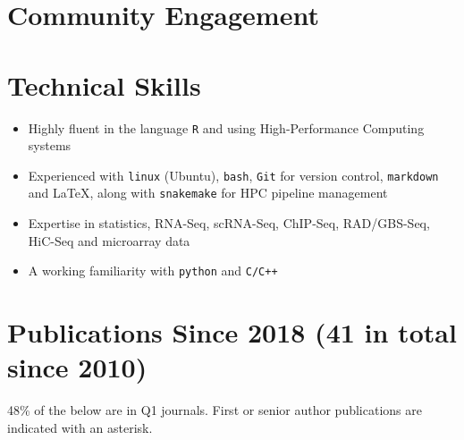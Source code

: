 \documentclass[11pt,a4paper,]{moderncv}
\providecommand{\tightlist}{%
	\setlength{\itemsep}{0pt}\setlength{\parskip}{0pt}}
\begin{document}
\hypertarget{community-engagement}{%
\section{Community Engagement}\label{community-engagement}}

\nopagebreak

\hypertarget{technical-skills}{%
\section{Technical Skills}\label{technical-skills}}

\begin{itemize}
\tightlist
\item
  Highly fluent in the language \texttt{R} and using High-Performance
  Computing systems
\item
  Experienced with \texttt{linux} (Ubuntu), \texttt{bash}, \texttt{Git}
  for version control, \texttt{markdown} and \LaTeX, along with
  \texttt{snakemake} for HPC pipeline management
\item
  Expertise in statistics, RNA-Seq, scRNA-Seq, ChIP-Seq, RAD/GBS-Seq,
  HiC-Seq and microarray data
\item
  A working familiarity with \texttt{python} and \texttt{C/C++}
\end{itemize}

\hypertarget{publications-since-2018-41-in-total-since-2010}{%
\section{Publications Since 2018 (41 in total since
2010)}\label{publications-since-2018-41-in-total-since-2010}}

48\% of the below are in Q1 journals. First or senior author
publications are indicated with an asterisk.

\vspace{4mm}
\end{document}
